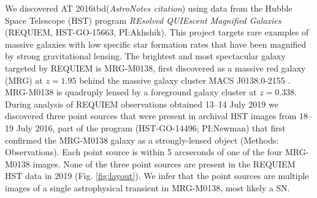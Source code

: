 \documentclass[12pt]{article}
\def\TNSname{AT 2016tbd\xspace}
\def\SNABC{AT 2016tbd\xspace}
\begin{document}
We discovered \SNABC ({\it AstroNotes citation})
using data from the Hubble Space Telescope (HST) program {\it REsolved QUIEscent Magnified Galaxies} (REQUIEM, HST-GO-15663, PI:Akhshik). This project targets rare examples of massive galaxies with low specific star formation rates that have been magnified by strong gravitational lensing. %
The brightest and most spectacular galaxy targeted by REQUIEM
is MRG-M0138, first discovered as a massive red galaxy (MRG) at $z=1.95$ \cite{newman_resolving_2018} behind the massive galaxy cluster MACS J0138.0-2155 \cite{ebeling_macs_2001}.
MRG-M0138 is quadruply lensed by a foreground galaxy cluster at $z=0.338$.  
During analysis of REQUIEM observations obtained 13--14 July 2019
we discovered three point 
sources that were present in archival HST images from 18--19 July 2016, part of the program (HST-GO-14496; PI:Newman)
that first confirmed the MRG-M0138 galaxy as a strongly-lensed object 
(Methods: Observations). 
Each point source is within 5 arcseconds of one of the four MRG-M0138 images.  None of the
three point sources are present in the REQUIEM HST data in 2019 (Fig. \ref{fig:layout}). We infer that 
the point sources are multiple images of a single astrophysical 
transient in MRG-M0138, most likely a SN. %
\end{document}
